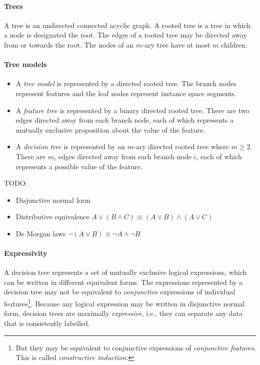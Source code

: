 \paragraph{Trees}

A tree is an undirected connected acyclic graph.
A rooted tree is a tree in which a node is designated the root.
The edges of a rooted tree may be directed away from or towards the root.
The nodes of an $m$-ary tree have at most $m$ children.

\paragraph{Tree models}

\begin{itemize}
  \item A \textit{tree model} is represented by a directed rooted tree.
        The branch nodes represent features and the leaf nodes represent instance space segments.
  \item A \textit{feature tree} is represented by a binary directed rooted tree.
        There are two edges directed away from each branch node, each of which represents a mutually exclusive proposition about the value of the feature.
  \item A \textit{decision tree} is represented by an $m$-ary directed rooted tree where $m \geq 2$.
        There are $m_i$ edges directed away from each branch node $i$, each of which represents a possible value of the feature.
\end{itemize}

TODO:

\begin{itemize}
  \item Disjunctive normal form
  \item Distributive equivalence $A \vee (B \wedge C) \equiv (A \vee B) \wedge (A \vee C)$
  \item De Morgan laws $\neg (A \vee B) \equiv \neg A \wedge \neg B$
\end{itemize}

\paragraph{Expressivity}

A decision tree represents a set of mutually exclusive logical expressions, which can be written in different equivalent forms.
The expressions represented by a decision tree may not be equivalent to \textit{conjunctive} expressions of individual features\footnote{But they may be equivalent to conjunctive expressions of \textit{conjunctive features}. This is called \textit{constructive induction}.}.
Because any logical expression may be written in disjunctive normal form, decision trees are maximally \textit{expressive}, i.e., they can separate any data that is consistently labelled.

